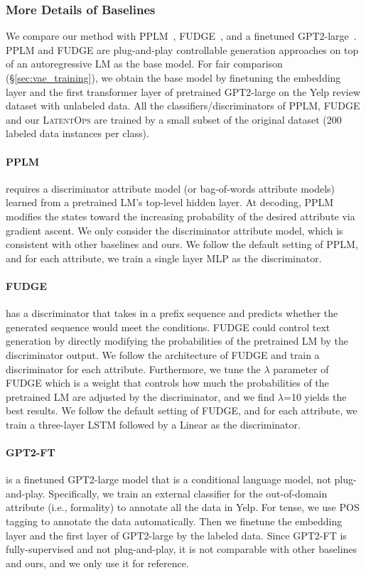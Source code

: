 \documentclass[11pt]{article}
\begin{document}
\subsubsection{More Details of Baselines}
\label{app:generation_baselines}
We compare our method with PPLM~\cite{Dathathri2020Plug}, FUDGE~\cite{DBLP:journals/corr/abs-2104-05218}, and a finetuned GPT2-large~\cite{gpt2}. PPLM and FUDGE are plug-and-play controllable generation approaches on top of an autoregressive LM as the base model. For fair comparison (\S\ref{sec:vae_training}), we obtain the base model by finetuning the embedding layer and the first transformer layer of pretrained GPT2-large on the Yelp review dataset with unlabeled data. All the classifiers/discriminators of PPLM, FUDGE and our \textsc{LatentOps} are trained by a small subset of the original dataset (200 labeled data instances per class). 
\paragraph{PPLM}  requires a discriminator attribute model (or bag-of-words attribute models) learned from a pretrained LM's top-level hidden layer. At decoding, PPLM modifies the states toward the increasing probability of the desired attribute via gradient ascent. We only consider the discriminator attribute model, which is consistent with other baselines and ours. We follow the default setting of PPLM, and for each attribute, we train a single layer MLP as the discriminator.  
\paragraph{FUDGE} has a discriminator that takes in a prefix sequence and predicts whether the generated sequence would meet the conditions. FUDGE could control text generation by directly modifying the probabilities of the pretrained LM by the discriminator output. 
We follow the architecture of FUDGE and train a discriminator for each attribute.
Furthermore, we tune the $\lambda$ parameter of FUDGE which is a weight that controls how much the probabilities of the pretrained LM are adjusted by the discriminator, and we find $\lambda$=10 yields the best results. We follow the default setting of FUDGE, and for each attribute, we train a three-layer LSTM followed by a Linear as the discriminator.
\paragraph{GPT2-FT} is a finetuned GPT2-large model that is a conditional language model, not plug-and-play. Specifically, we train an external classifier for the out-of-domain attribute (i.e., formality) to annotate all the data in Yelp. For tense, we use POS tagging to annotate the data automatically. Then we finetune the embedding layer and the first layer of GPT2-large by the labeled data. Since GPT2-FT is fully-supervised and not plug-and-play, it is not comparable with other baselines and ours, and we only use it for reference.
\end{document}
